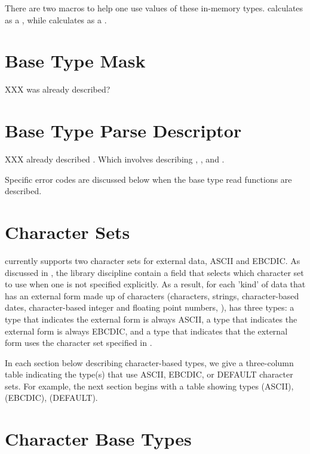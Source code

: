 There are two macros to help one use values of these in-memory types.
 calculates  as a ,
while  calculates  as a .

\section{Base Type Mask}
\label{sec:base-type-mask}

XXX \Pbasem{} was already described?

\section{Base Type Parse Descriptor}
\label{sec:base-type-parse-descriptors}

XXX already described \Pbasepd{}.  Which involves describing \Ploct{}, \Ppost{},
and \PerrCodet{}.  

Specific error codes are discussed below
when the base type read functions are described.

\section{Character Sets}

\PADSL{} currently supports two character sets for external data, ASCII and EBCDIC.
As discussed in , the library
discipline contain a field
 that selects which character set to use when
one is not specified explicitly.  As a result, for each 'kind' of data
that has an external form made up of characters (characters, strings,
character-based dates, character-based integer and floating point
numbers, \etc{}), \PADSL{} has three types: a type that indicates the external
form is always ASCII, a type that indicates the external form is
always EBCDIC, and a type that indicates that the external form uses
the character set specified in .

In each section below describing character-based types, we give a
three-column table indicating the type(s) that use ASCII, EBCDIC, or
DEFAULT character sets.  For example, the next section begins with a
table showing types  (ASCII),  (EBCDIC), 
(DEFAULT).

\section{Character Base Types}

